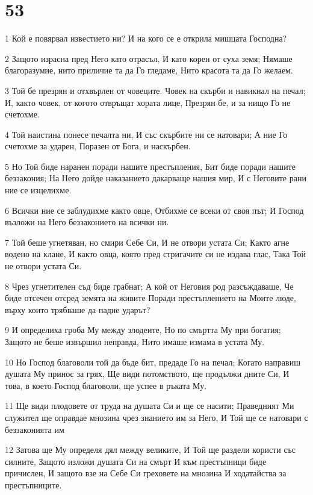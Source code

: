 \chapter{53}

\par 1 Кой е повярвал известието ни? И на кого се е открила мишцата Господна?
\par 2 Защото израсна пред Него като отрасъл, И като корен от суха земя; Нямаше благоразумие, нито приличие та да Го гледаме, Нито красота та да Го желаем.
\par 3 Той бе презрян и отхвърлен от човеците. Човек на скърби и навикнал на печал; И, както човек, от когото отвръщат хората лице, Презрян бе, и за нищо Го не счетохме.
\par 4 Той наистина понесе печалта ни, И със скърбите ни се натовари; А ние Го счетохме за ударен, Поразен от Бога, и наскърбен.
\par 5 Но Той биде наранен поради нашите престъпления, Бит биде поради нашите беззакония; На Него дойде наказанието дакарваще нашия мир, И с Неговите рани ние се изцелихме.
\par 6 Всички ние се заблудихме както овце, Отбихме се всеки от своя път; И Господ възложи на Него беззаконието на всички ни.
\par 7 Той беше угнетяван, но смири Себе Си, И не отвори устата Си; Както агне водено на клане, И както овца, която пред стригачите си не издава глас, Така Той не отвори устата Си.
\par 8 Чрез угнетителен съд биде грабнат; А кой от Неговия род разсъждаваше, Че биде отсечен отсред земята на живите Поради престъплението на Моите люде, върху които трябваше да падне ударът?
\par 9 И определиха гроба Му между злодеите, Но по смъртта Му при богатия; Защото не беше извършил неправда, Нито имаше измама в устата Му.
\par 10 Но Господ благоволи той да бъде бит, предаде Го на печал; Когато направиш душата Му принос за грях, Ще види потомството, ще продължи дните Си, И това, в което Господ благоволи, ще успее в ръката Му.
\par 11 Ще види плодовете от труда на душата Си и ще се насити; Праведният Ми служител ще оправдае мнозина чрез знанието им за Него, И Той ще се натовари с беззаконията им
\par 12 Затова ще Му определя дял между великите, И Той ще раздели користи със силните, Защото изложи душата Си на смърт И към престъпници биде причислен, И защото взе на Себе Си греховете на мнозина И ходатайства за престъпниците.

